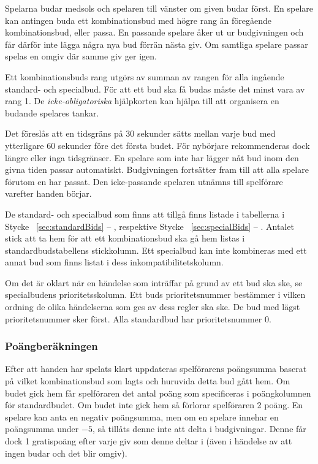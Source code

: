 \documentclass[a4paper]{article} %
\renewcommand{\sectionref}[1]{%
	\ref{sec:#1} -- \nameref{sec:#1}%
}
\begin{document}
	Spelarna budar medsols och spelaren till vänster om given budar först. En spelare kan antingen buda ett kombinationsbud med högre rang än föregående kombinationsbud, eller passa. En passande spelare åker ut ur budgivningen och får därför inte lägga några nya bud förrän nästa giv. Om samtliga spelare passar spelas en omgiv där samme giv ger igen.

	Ett kombinationsbuds rang utgörs av summan av rangen för alla ingående standard- och specialbud. För att ett bud ska få budas måste det minst vara av rang 1. De \emph{icke-obligatoriska} hjälpkorten kan hjälpa till att organisera en budande spelares tankar.

	Det föreslås att en tidsgräns på 30 sekunder sätts mellan varje bud med ytterligare 60 sekunder före det första budet. För nybörjare rekommenderas dock längre eller inga tidsgränser. En spelare som inte har lägger nåt bud inom den givna tiden passar automatiskt. Budgivningen fortsätter fram till att alla spelare förutom en har passat. Den icke-passande spelaren utnämns till spelförare varefter handen börjar.

	De standard- och specialbud som finns att tillgå finns listade i tabellerna i Stycke~\sectionref{standardBids}, respektive Stycke~\sectionref{specialBids}. Antalet stick att ta hem för att ett kombinationsbud ska gå hem listas i standardbudstabellens stickkolumn. Ett specialbud kan inte kombineras med ett annat bud som finns listat i dess inkompatibilitetskolumn.

	Om det är oklart när en händelse som inträffar på grund av ett bud ska ske, se specialbudens prioritetsskolumn. Ett buds prioritetsnummer bestämmer i vilken ordning de olika händelserna som ges av dess regler ska ske. De bud med lägst prioritetsnummer sker först. Alla standardbud har prioritetsnummer 0.

	\subsubsection{Poängberäkningen}
	Efter att handen har spelats klart uppdateras spelförarens poängsumma baserat på vilket kombinationsbud som lagts och huruvida detta bud gått hem. Om budet gick hem får spelföraren det antal poäng som specificeras i poängkolumnen för standardbudet. Om budet inte gick hem så förlorar spelföraren 2 poäng. En spelare kan anta en negativ poängsumma, men om en spelare innehar en poängsumma under $-5$, så tillåts denne inte att delta i budgivningar. Denne får dock 1 gratispoäng efter varje giv som denne deltar i (även i händelse av att ingen budar och det blir omgiv).
\end{document}

